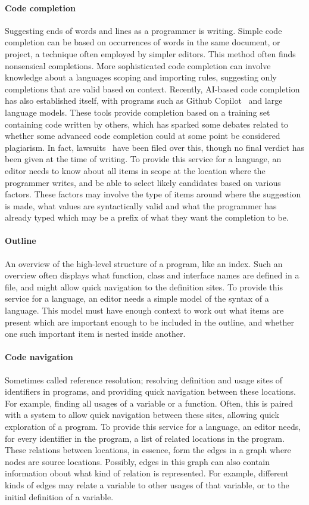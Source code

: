 \paragraph{Code completion}
Suggesting ends of words and lines as a programmer is writing.
Simple code completion can be based on occurrences of words in the same document, or project, a technique often employed by simpler editors.
This method often finds nonsensical completions.
More sophisticated code completion can involve knowledge about a languages scoping and importing rules, suggesting only completions that are valid based on context.
Recently, AI-based code completion has also established itself, with programs such as Github Copilot~\autocite{copilot} and large language models.
These tools provide completion based on a training set containing code written by others, which has sparked some debates related to whether some advanced code completion could at some point be considered plagiarism.
In fact, lawsuits~\autocite{copilot_lawsuit} have been filed over this, though no final verdict has been given at the time of writing.
To provide this service for a language, an editor needs to know about all items in scope at the location where the programmer writes, and be able to select likely candidates based on various factors.
These factors may involve the type of items around where the suggestion is made, what values are syntactically valid and what the programmer has already typed which may be a prefix of what they want the completion to be.

\paragraph{Outline}
An overview of the high-level structure of a program, like an index.
Such an overview often displays what function, class and interface names are defined in a file, and might allow quick navigation to the definition sites.
To provide this service for a language, an editor needs a simple model of the syntax of a language.
This model must have enough context to work out what items are present which are important enough to be included in the outline, and whether one such important item is nested inside another.

\paragraph{Code navigation}
Sometimes called reference resolution; resolving definition and usage sites of identifiers in programs, and providing quick navigation between these locations.
For example, finding all usages of a variable or a function.
Often, this is paired with a system to allow quick navigation between these sites, allowing quick exploration of a program.
To provide this service for a language, an editor needs, for every identifier in the program, a list of related locations in the program.
These relations between locations, in essence, form the edges in a graph where nodes are source locations.
Possibly, edges in this graph can also contain information obout what kind of relation is represented.
For example, different kinds of edges may relate a variable to other usages of that variable, or to the initial definition of a variable.

